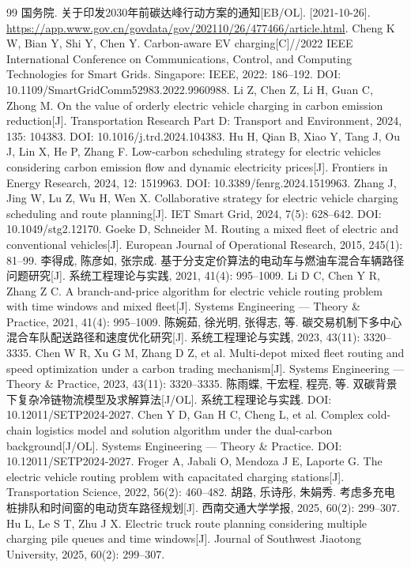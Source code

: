\documentclass{setp-new}
\begin{document}
\begin{thebibliography}{99}
 国务院. 关于印发2030年前碳达峰行动方案的通知[EB/OL]. [2021-10-26]. \url{https://app.www.gov.cn/govdata/gov/202110/26/477466/article.html}.
 Cheng K W, Bian Y, Shi Y, Chen Y. Carbon-aware EV charging[C]//2022 IEEE International Conference on Communications, Control, and Computing Technologies for Smart Grids. Singapore: IEEE, 2022: 186--192. DOI: 10.1109/SmartGridComm52983.2022.9960988.
 Li Z, Chen Z, Li H, Guan C, Zhong M. On the value of orderly electric vehicle charging in carbon emission reduction[J]. Transportation Research Part D: Transport and Environment, 2024, 135: 104383. DOI: 10.1016/j.trd.2024.104383.
 Hu H, Qian B, Xiao Y, Tang J, Ou J, Lin X, He P, Zhang F. Low-carbon scheduling strategy for electric vehicles considering carbon emission flow and dynamic electricity prices[J]. Frontiers in Energy Research, 2024, 12: 1519963. DOI: 10.3389/fenrg.2024.1519963.
 Zhang J, Jing W, Lu Z, Wu H, Wen X. Collaborative strategy for electric vehicle charging scheduling and route planning[J]. IET Smart Grid, 2024, 7(5): 628--642. DOI: 10.1049/stg2.12170.
 Goeke D, Schneider M. Routing a mixed fleet of electric and conventional vehicles[J]. European Journal of Operational Research, 2015, 245(1): 81--99.
 李得成, 陈彦如, 张宗成. 基于分支定价算法的电动车与燃油车混合车辆路径问题研究[J]. 系统工程理论与实践, 2021, 41(4): 995--1009. Li D C, Chen Y R, Zhang Z C. A branch-and-price algorithm for electric vehicle routing problem with time windows and mixed fleet[J]. Systems Engineering --- Theory \& Practice, 2021, 41(4): 995--1009.
 陈婉茹, 徐光明, 张得志, 等. 碳交易机制下多中心混合车队配送路径和速度优化研究[J]. 系统工程理论与实践, 2023, 43(11): 3320--3335. Chen W R, Xu G M, Zhang D Z, et al. Multi-depot mixed fleet routing and speed optimization under a carbon trading mechanism[J]. Systems Engineering --- Theory \& Practice, 2023, 43(11): 3320--3335.
 陈雨蝶, 干宏程, 程亮, 等. 双碳背景下复杂冷链物流模型及求解算法[J/OL]. 系统工程理论与实践. DOI: 10.12011/SETP2024-2027. Chen Y D, Gan H C, Cheng L, et al. Complex cold-chain logistics model and solution algorithm under the dual-carbon background[J/OL]. Systems Engineering --- Theory \& Practice. DOI: 10.12011/SETP2024-2027.
 Froger A, Jabali O, Mendoza J E, Laporte G. The electric vehicle routing problem with capacitated charging stations[J]. Transportation Science, 2022, 56(2): 460--482.
 胡路, 乐诗彤, 朱娟秀. 考虑多充电桩排队和时间窗的电动货车路径规划[J]. 西南交通大学学报, 2025, 60(2): 299--307. Hu L, Le S T, Zhu J X. Electric truck route planning considering multiple charging pile queues and time windows[J]. Journal of Southwest Jiaotong University, 2025, 60(2): 299--307.

\end{thebibliography}
\end{document}
